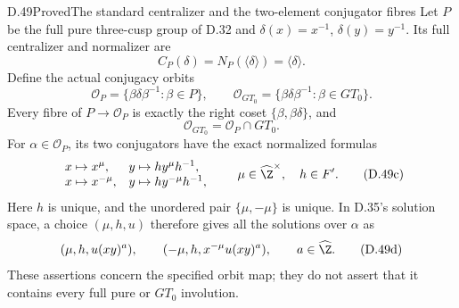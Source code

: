 \begin{claim}{D.49}{Proved}{The standard centralizer and the two-element conjugator fibres}
Let $P$ be the full pure three-cusp group of D.32 and
$\delta(x)=x^{-1}$, $\delta(y)=y^{-1}$.
Its full centralizer and normalizer are
\[
             C_P(\delta)=N_P(\langle\delta\rangle)
                         =\langle\delta\rangle.         \tag{D.49a}
\]
Define the actual conjugacy orbits
\[
 \mathcal O_P=\{\beta\delta\beta^{-1}:\beta\in P\},
 \qquad
 \mathcal O_{GT_0}=\{\beta\delta\beta^{-1}:\beta\in GT_0\}.
\]
Every fibre of $P\to\mathcal O_P$ is exactly the
right coset $\{\beta,\beta\delta\}$, and
\[
                    \mathcal O_{GT_0}
                            =\mathcal O_P\cap GT_0.     \tag{D.49b}
\]
For $\alpha\in\mathcal O_P$, its two conjugators
have the exact normalized formulas
\[
 \begin{array}{ll}
  x\mapsto x^\mu,& y\mapsto h y^\mu h^{-1},\\
  x\mapsto x^{-\mu},& y\mapsto h y^{-\mu}h^{-1},
 \end{array}
       \qquad \mu\in\widehat\Z^\times,\quad h\in F'.   \tag{D.49c}
\]
Here $h$ is unique, and the unordered pair
$\{\mu,-\mu\}$ is unique.
In D.35's solution space, a choice $(\mu,h,u)$
therefore gives all the solutions over $\alpha$ as
\[
 (\mu,h,u(xy)^a),\qquad
 (-\mu,h,x^{-\mu}u(xy)^a),\qquad a\in\widehat\Z.
                                                        \tag{D.49d}
\]
These assertions concern the specified orbit map;
they do not assert that it contains every full
pure or $GT_0$ involution.
\end{claim}
